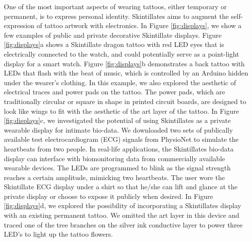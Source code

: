 \documentclass{sigchi}
\begin{document}
One of the most important aspects of wearing tattoos, either temporary or permanent, is to express personal identity. Skintillates aims to augment the self-expression of tattoo artwork with electronics. In Figure \ref{fig:displays}, we show a few examples of public and private decorative Skintillate displays. Figure \ref{fig:displays}a shows a Skintillate dragon tattoo with red LED eyes that is electrically connected to the watch, and could potentially serve as a point-light display for a smart watch. Figure \ref{fig:displays}b demonstrates a back tattoo with LEDs that flash with the beat of music, which is controlled by an Arduino hidden under the wearer's clothing.  In this example, we also explored the aesthetic of electrical traces and power pads on the tattoo. The power pads, which are traditionally circular or square in shape in printed circuit boards, are designed to look like wings to fit with the aesthetic of the art layer of the tattoo. In Figure \ref{fig:displays}c, we investigated the potential of using Skintillates as a private wearable display for intimate bio-data. We downloaded two sets of publically available test electrocardiogram (ECG) signals from PhysioNet to simulate the heartbeats from two people. In real-life applications, the Skintillates bio-data display can interface with biomonitoring data from commercially available wearable devices. The LEDs are programmed to blink as the signal strength reaches a certain amplitude, mimicking two heartbeats. The user wore the Skintillate ECG display under a shirt so that he/she can lift and glance at the private display or choose to expose it publicly when desired. In Figure \ref{fig:displays}d, we explored the possibility of incorporating a Skintillates display with an existing permanent tattoo. We omitted the art layer in this device and traced one of the tree branches on the silver ink conductive layer to power three LED’s to light up the tattoo flowers.
\end{document}
